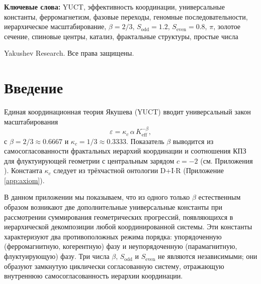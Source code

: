 \documentclass[12pt,a4paper]{article}
\begin{document}
\begin{titlepage}
\begin{center}
\begin{minipage}{0.9\textwidth}
\begin{abstract}
					Кроме того, те же константы возникают в асимптотическом распределении простых чисел, что даёт независимую количественную проверку YUCT: теоретическая поправка к формуле Россера для \(n\)-го простого числа равна \(-\frac{S_{\text{even}}}{2}n^{1-\beta}\ln n\) (Приложение PrimeN). Существование такой самосогласованной структуры демонстрирует предсказательную силу YUCT и предоставляет новый количественный язык для описания переходов порядок-беспорядок на всех масштабах.
				\end{abstract}
			\end{minipage}
			
			\vspace{1cm}
			\noindent
			\small\textbf{Ключевые слова:} YUCT, эффективность координации, универсальные константы, ферромагнетизм, фазовые переходы, геномные последовательности, иерархическое масштабирование, \(\beta = 2/3\), \(S_{\text{odd}} = 1.2\), \(S_{\text{even}} = 0.8\), \(\pi\), золотое сечение, спиновые центры, катализ, фрактальные структуры, простые числа
			
			\vspace{0.5cm}
			\noindent
			 Yakushev Research. Все права защищены.
		\end{center}
	\end{titlepage}
	
	\tableofcontents
	\newpage
	
	\section{Введение}
	Единая координационная теория Якушева (YUCT) вводит универсальный закон масштабирования
	\[
	\varepsilon = \kappa_c \, \alpha \, K_{\mathrm{eff}}^{-\beta},
	\]
	с \(\beta = 2/3 \approx 0.6667\) и \(\kappa_c = 1/3 \approx 0.3333\). Показатель \(\beta\) выводится из самосогласованности фрактальных иерархий координации и соотношения КПЗ для флуктуирующей геометрии с центральным зарядом \(c = -2\) (см. Приложения \cite{AppendixL, AppendixY}). Константа \(\kappa_c\) следует из трёхчастной онтологии D+I\(\cdot\)R (Приложение \ref{app:axiom}).
	
	В данном приложении мы показываем, что из одного только \(\beta\) естественным образом возникают две дополнительные универсальные константы при рассмотрении суммирования геометрических прогрессий, появляющихся в иерархической декомпозиции любой координированной системы. Эти константы характеризуют два противоположных режима порядка: упорядоченную (ферромагнитную, когерентную) фазу и неупорядоченную (парамагнитную, флуктуирующую) фазу. Три числа \(\beta\), \(S_{\text{odd}}\) и \(S_{\text{even}}\) не являются независимыми; они образуют замкнутую циклически согласованную систему, отражающую внутреннюю самосогласованность иерархии координации.
	
\end{document}
